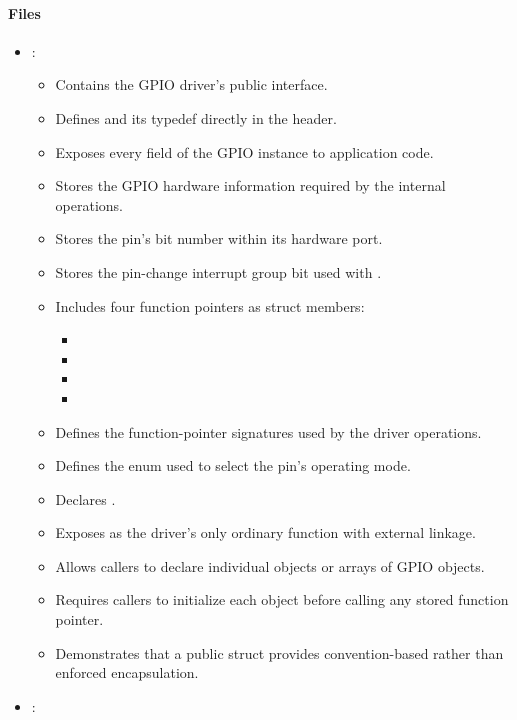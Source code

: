 \paragraph{Files}
\begin{itemize}
  \item {}:
  \begin{itemize}
    \item Contains the GPIO driver's public interface.
    \item Defines  and its  typedef directly in the header.
    \item Exposes every field of the GPIO instance to application code.
    \item Stores the GPIO hardware information required by the internal operations.
    \item Stores the pin's bit number within its hardware port.
    \item Stores the pin-change interrupt group bit used with .
    \item Includes four function pointers as struct members:
    \begin{itemize}
      \item {}
      \item {}
      \item {}
      \item {}
    \end{itemize}
    \item Defines the function-pointer signatures used by the driver operations.
    \item Defines the  enum used to select the pin's operating mode.
    \item Declares .
    \item Exposes  as the driver's only ordinary function with external linkage.
    \item Allows callers to declare individual  objects or arrays of GPIO objects.
    \item Requires callers to initialize each object before calling any stored function pointer.
    \item Demonstrates that a public struct provides convention-based rather than enforced
      encapsulation.
  \end{itemize}
  \item {}:
  \begin{itemize}

\end{itemize}
\end{itemize}
